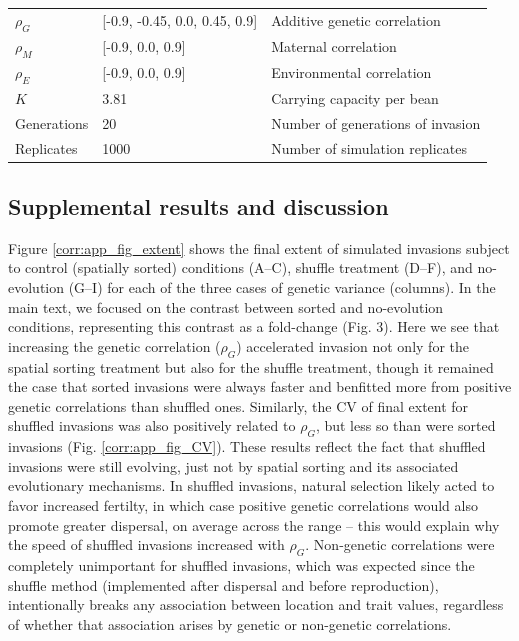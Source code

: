 \documentclass[11pt]{article}
\begin{document}
\begin{table}[h]
\begin{tabularx}{0.95\linewidth}{llX}
$\rho_{G}$   & [-0.9, -0.45, 0.0, 0.45, 0.9]        & Additive genetic correlation          \\
$\rho_{M}$   & [-0.9, 0.0, 0.9]        & Maternal correlation          \\
$\rho_{E}$   & [-0.9, 0.0, 0.9]       & Environmental correlation             \\
$K$          & 3.81                                   & Carrying capacity per bean                          \\
Generations  & 20                                     & Number of generations of invasion                 \\
Replicates   & 1000                                   & Number of simulation replicates                   \\ \bottomrule
\end{tabularx}
\end{table}

\subsection*{Supplemental results and discussion}
Figure \ref{corr:app_fig_extent} shows the final extent of simulated invasions subject to control (spatially sorted) conditions (A--C), shuffle treatment (D--F), and no-evolution (G--I) for each of the three cases of genetic variance (columns).
In the main text, we focused on the contrast between sorted and no-evolution conditions, representing this contrast as a fold-change (Fig. 3).
Here we see that increasing the genetic correlation ($\rho_{G}$) accelerated invasion not only for the spatial sorting treatment but also for the shuffle treatment, though it remained the case that sorted invasions were always faster and benfitted more from positive genetic correlations than shuffled ones.
Similarly, the CV of final extent for shuffled invasions was also positively related  to $\rho_{G}$, but less so than were sorted invasions (Fig. \ref{corr:app_fig_CV}). 
These results reflect the fact that shuffled invasions were still evolving, just not by spatial sorting and its associated evolutionary mechanisms. 
In shuffled invasions, natural selection likely acted to favor increased fertilty, in which case positive genetic correlations would also promote greater dispersal, on average across the range -- this would explain why the speed of shuffled invasions increased with $\rho_{G}$.
Non-genetic correlations were completely unimportant for shuffled invasions, which was expected since the shuffle method (implemented after dispersal and before reproduction), intentionally breaks any association between location and trait values, regardless of whether that association arises by genetic or non-genetic correlations. 
\end{document}

